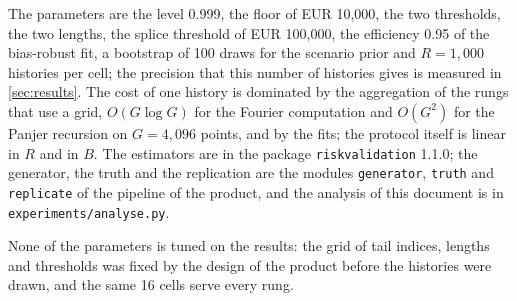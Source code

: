 The parameters are the level 0.999, the floor of EUR 10,000, the two thresholds, the two lengths, the splice threshold of EUR 100,000, the efficiency 0.95 of the bias-robust fit, a bootstrap of 100 draws for the scenario prior and $R=1{,}000$ histories per cell; the precision that this number of histories gives is measured in \cref{sec:results}.
The cost of one history is dominated by the aggregation of the rungs that use a grid, $O(G\log G)$ for the Fourier computation and $O(G^2)$ for the Panjer recursion on $G=4{,}096$ points, and by the fits; the protocol itself is linear in $R$ and in $B$. The estimators are in the package \texttt{riskvalidation} 1.1.0; the generator, the truth and the replication are the modules \texttt{generator}, \texttt{truth} and \texttt{replicate} of the pipeline of the product, and the analysis of this document is in \texttt{experiments/analyse.py}.

None of the parameters is tuned on the results: the grid of tail indices, lengths and thresholds was fixed by the design of the product before the histories were drawn, and the same 16 cells serve every rung.
